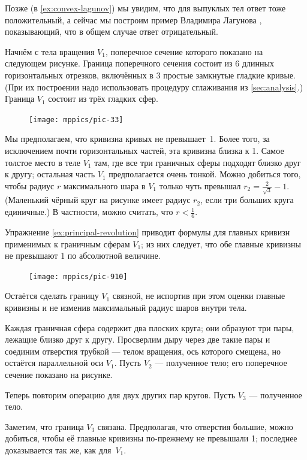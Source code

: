 Позже (в \ref{ex:convex-lagunov}) мы увидим, что для выпуклых тел ответ тоже положительный,
а сейчас мы построим пример Владимира Лагунова \cite{lagunov-1961}, показывающий, что в общем случае ответ отрицательный.

Начнём с тела вращения $V_1$, поперечное сечение которого показано на следующем рисунке.
Граница поперечного сечения состоит из 6 длинных горизонтальных отрезков, включённых в 3 простые замкнутые гладкие кривые.
(При их построении надо использовать процедуру сглаживания из \ref{sec:analysis}.)
Граница $V_1$ состоит из трёх гладких сфер.

\begin{figure}[hb!]
\centering
\texttt{[image: mppics/pic-33]}
\vskip0mm
\end{figure}

Мы предполагаем, что кривизна кривых не превышает~1.
Более того, за исключением почти горизонтальных частей, эта кривизна близка к 1.
Самое толстое место в теле $V_1$ там, где все три граничных сферы подходят близко друг к другу;
остальная часть $V_1$ предполагается очень тонкой.
Можно добиться того, чтобы радиус $r$ максимального шара в $V_1$ только чуть превышал $r_2=\tfrac2{\sqrt{3}}-1$.
(Маленький чёрный круг на рисунке имеет радиус $r_2$, если три больших круга единичные.)
В частности, можно считать, что $r<\tfrac16$.

Упражнение \ref{ex:principal-revolution} приводит формулы для главных кривизн применимых к граничным сферам $V_1$;
из них следует, что обе главные кривизны не превышают 1 по абсолютной величине.

\begin{figure}
\vskip-0mm
\centering
\texttt{[image: mppics/pic-910]}
\vskip0mm
\end{figure}

Остаётся сделать границу $V_1$ связной, не испортив при этом оценки главные кривизны и не изменив максимальный радиус шаров внутри тела.

Каждая граничная сфера содержит два плоских круга; они образуют три пары, лежащие близко друг к другу.
Просверлим дыру через две такие пары и соединим отверстия трубкой --- телом вращения, ось которого смещена, но остаётся параллельной оси $V_1$.
Пусть $V_2$ --- полученное тело; его поперечное сечение показано на рисунке.

Теперь повторим операцию для двух других пар кругов.
Пусть $V_3$ --- полученное тело.

Заметим, что граница $V_3$ связана.
Предполагая, что отверстия большие, можно добиться, чтобы её главные кривизны по-прежнему не превышали 1; последнее доказывается так же, как для~$V_1$.
\qeds



